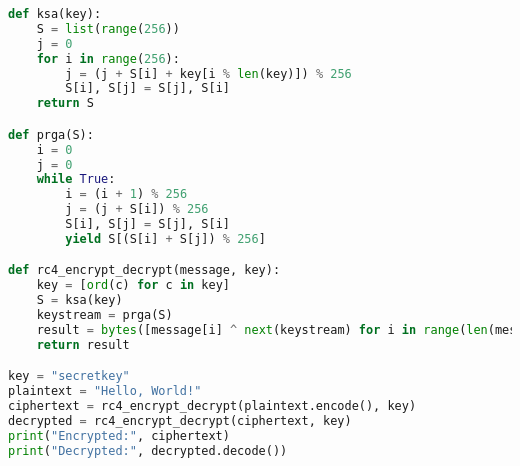 \begin{lstlisting}[language=Python]
def ksa(key):
    S = list(range(256))
    j = 0
    for i in range(256):
        j = (j + S[i] + key[i % len(key)]) % 256
        S[i], S[j] = S[j], S[i]
    return S

def prga(S):
    i = 0
    j = 0
    while True:
        i = (i + 1) % 256
        j = (j + S[i]) % 256
        S[i], S[j] = S[j], S[i]
        yield S[(S[i] + S[j]) % 256]

def rc4_encrypt_decrypt(message, key):
    key = [ord(c) for c in key]
    S = ksa(key)
    keystream = prga(S)
    result = bytes([message[i] ^ next(keystream) for i in range(len(message))])
    return result

key = "secretkey"
plaintext = "Hello, World!"
ciphertext = rc4_encrypt_decrypt(plaintext.encode(), key)
decrypted = rc4_encrypt_decrypt(ciphertext, key)
print("Encrypted:", ciphertext)
print("Decrypted:", decrypted.decode())
\end{lstlisting}

\newpage
